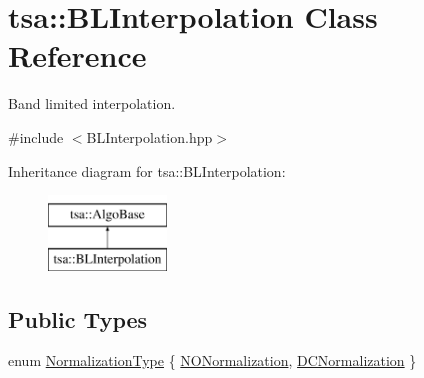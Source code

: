 \hypertarget{classtsa_1_1_b_l_interpolation}{}\section{tsa\+:\+:B\+L\+Interpolation Class Reference}
\label{classtsa_1_1_b_l_interpolation}


Band limited interpolation.  




{\ttfamily \#include $<$B\+L\+Interpolation.\+hpp$>$}

Inheritance diagram for tsa\+:\+:B\+L\+Interpolation\+:\begin{figure}[H]
\begin{center}
\leavevmode
\includegraphics[height=2.000000cm]{classtsa_1_1_b_l_interpolation}
\end{center}
\end{figure}
\subsection*{Public Types}
\begin{DoxyCompactItemize}
\item 
enum \hyperlink{classtsa_1_1_b_l_interpolation_ae11719d30e353da11f076289b87c7b1d}{Normalization\+Type} \{ \hyperlink{classtsa_1_1_b_l_interpolation_ae11719d30e353da11f076289b87c7b1da2eb150e3b7e6ed1aff3dadd9dae02b5b}{N\+O\+Normalization}, 
\hyperlink{classtsa_1_1_b_l_interpolation_ae11719d30e353da11f076289b87c7b1da203bdef13ad529ea833b62c762c1a395}{D\+C\+Normalization}
 \}
\end{DoxyCompactItemize}
